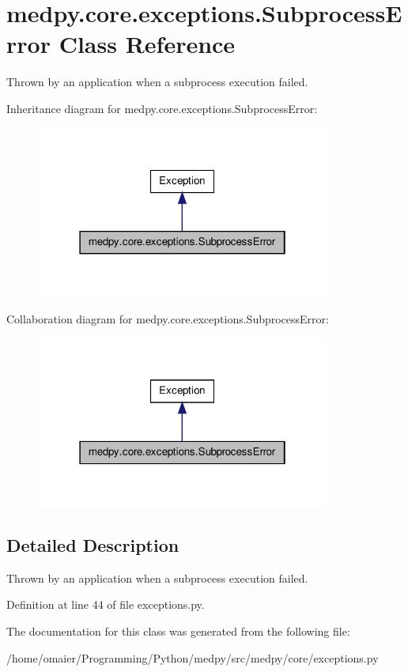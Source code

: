 \hypertarget{classmedpy_1_1core_1_1exceptions_1_1SubprocessError}{
\section{medpy.core.exceptions.SubprocessError Class Reference}
\label{classmedpy_1_1core_1_1exceptions_1_1SubprocessError}
}


Thrown by an application when a subprocess execution failed.  




Inheritance diagram for medpy.core.exceptions.SubprocessError:\nopagebreak
\begin{figure}[H]
\begin{center}
\leavevmode
\includegraphics[width=274pt]{classmedpy_1_1core_1_1exceptions_1_1SubprocessError__inherit__graph}
\end{center}
\end{figure}


Collaboration diagram for medpy.core.exceptions.SubprocessError:\nopagebreak
\begin{figure}[H]
\begin{center}
\leavevmode
\includegraphics[width=274pt]{classmedpy_1_1core_1_1exceptions_1_1SubprocessError__coll__graph}
\end{center}
\end{figure}


\subsection{Detailed Description}
Thrown by an application when a subprocess execution failed. 

Definition at line 44 of file exceptions.py.



The documentation for this class was generated from the following file:\begin{DoxyCompactItemize}
\item 
/home/omaier/Programming/Python/medpy/src/medpy/core/exceptions.py\end{DoxyCompactItemize}
